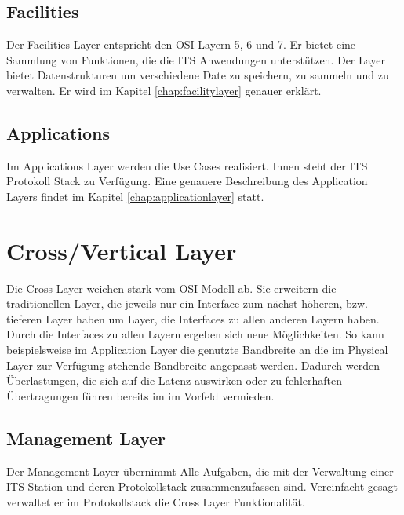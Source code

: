 \subsection{Facilities}
Der Facilities Layer entspricht den \ac{OSI} Layern 5, 6 und 7. Er bietet eine Sammlung von Funktionen, die die \ac{ITS} Anwendungen unterstützen. Der Layer bietet Datenstrukturen um verschiedene Date zu speichern, zu sammeln und zu verwalten. Er wird im Kapitel \ref{chap:facilitylayer} genauer erklärt.

\subsection{Applications}
Im Applications Layer werden die Use Cases realisiert. Ihnen steht der \ac{ITS} Protokoll Stack zu Verfügung. Eine genauere Beschreibung des Application Layers findet im Kapitel \ref{chap:applicationlayer} statt.

\section{Cross/Vertical Layer}
Die Cross Layer weichen stark vom \ac{OSI} Modell ab. Sie erweitern die traditionellen Layer, die jeweils nur ein Interface zum nächst höheren, bzw. tieferen Layer haben um Layer, die Interfaces zu allen anderen Layern haben. Durch die Interfaces zu allen Layern ergeben sich neue Möglichkeiten. So kann beispielsweise im Application Layer die genutzte Bandbreite an die im Physical Layer zur Verfügung stehende Bandbreite angepasst werden. Dadurch werden Überlastungen, die sich auf die Latenz auswirken oder zu fehlerhaften Übertragungen führen bereits im im Vorfeld vermieden.

\subsection{Management Layer \label{architektur_managementLayer}}
Der Management Layer übernimmt Alle Aufgaben, die mit der Verwaltung einer \ac{ITS} Station und deren Protokollstack zusammenzufassen sind. Vereinfacht gesagt verwaltet er im Protokollstack die Cross Layer Funktionalität. 


